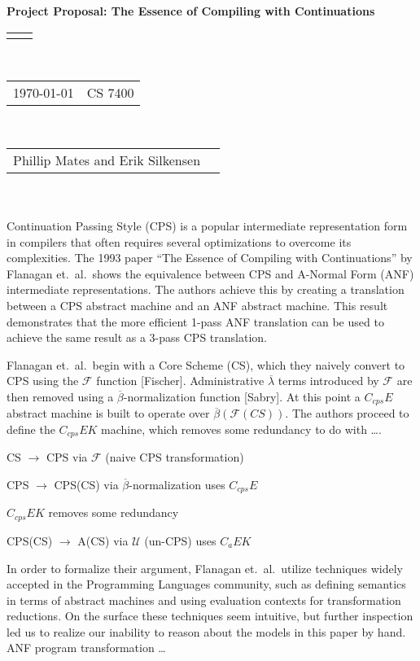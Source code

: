 \documentclass[12pt]{article}
\renewcommand{\title}[1]{\textbf{#1}\\}
\renewcommand{\line}{\begin{tabularx}{\textwidth}{X>{\raggedleft}X}\hline\\\end{tabularx}\\[-0.5cm]}
\newcommand{\leftright}[2]{\begin{tabularx}{\textwidth}{X>{\raggedleft}X}#1
\newcommand{\norm}[1]{\lVert#1\rVert}
& #2\\\end{tabularx}\\[-0.5cm]}
\begin{document}
\title{Project Proposal: The Essence of Compiling with Continuations}
\line
\leftright{\today}{CS 7400} %
\leftright{Phillip Mates and Erik Silkensen}{} \\ %


Continuation Passing Style (CPS) is a popular intermediate representation form in compilers that often requires several optimizations to overcome its complexities. The 1993 paper ``The Essence of Compiling with Continuations'' by Flanagan et.\ al.\ shows the equivalence between CPS and A-Normal Form (ANF) intermediate representations.
The authors achieve this by creating a translation between a CPS abstract machine and an ANF abstract machine.
This result demonstrates that the more efficient 1-pass ANF translation can be used to achieve the same result as a 3-pass CPS translation.

Flanagan et.\ al.\ begin with a Core Scheme (CS), which they naively convert to CPS using the $\mathcal{F}$ function [Fischer]. Administrative $\overline{\lambda}$ terms introduced by $\mathcal{F}$ are then removed using a $\overline{\beta}$-normalization function [Sabry]. At this point a $C_{cps}E$ abstract machine is built to operate over $\overline{\beta}(\mathcal{F}(\textit{CS}))$. The authors proceed to define the $C_{cps}EK$ machine, which removes some redundancy to do with \ldots.

CS $\to$ CPS via $\mathcal{F}$ (naive CPS transformation) 

CPS $\to$ CPS(CS) via $\overline{\beta}$-normalization uses $C_{cps}E$

$C_{cps}EK$ removes some redundancy

CPS(CS) $\to$ A(CS) via $\mathcal{U}$ (un-CPS) uses $C_{a}EK$

In order to formalize their argument, Flanagan et.\ al.\ utilize techniques widely accepted in the Programming Languages community, such as defining semantics in terms of abstract machines and using evaluation contexts for transformation reductions.
On the surface these techniques seem intuitive, but further inspection led us to realize our inability to reason about the models in this paper by hand.
ANF program transformation \ldots
\end{document}
